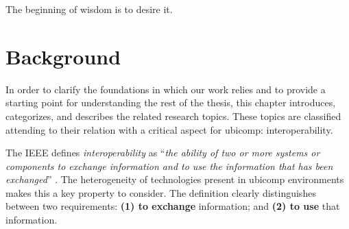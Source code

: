 
\begin{savequote}[50mm]
The beginning of wisdom is to desire it.
\end{savequote}


\chapter{Background}
\label{cha:background}

\ifpdf
    \graphicspath{{\pathchaptwo/figures/PNG/}{\pathchaptwo/figures/PDF/}{\pathchaptwo/figures/}}
\else
    \graphicspath{{\pathchaptwo/figures/EPS/}{\pathchaptwo/figures/}}
\fi



In order to clarify the foundations in which our work relies and to provide a starting point for understanding the rest of the thesis,
this chapter introduces, categorizes, and describes the related research topics. %
These topics are classified attending to their relation with a critical aspect for \ac{ubicomp}: interoperability.



The IEEE defines \emph{interoperability} as ``\emph{the ability of two or more systems or components to exchange information and to use the information that has been exchanged}'' \citep{_ieee_1990}.
The heterogeneity of technologies present in \ac{ubicomp} environments makes this a key property to consider.
The definition clearly distinguishes between two requirements: %
\textbf{(1) to exchange} information; and
\textbf{(2) to use} that information. %

\medskip

